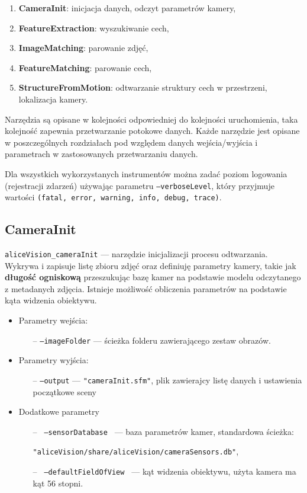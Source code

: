\begin{enumerate}
   \item \textbf{CameraInit}: inicjacja danych, odczyt parametrów kamery,
   \item \textbf{FeatureExtraction}: wyszukiwanie cech,
   \item \textbf{ImageMatching}: parowanie zdjęć,
   \item \textbf{FeatureMatching}: parowanie cech,
   \item \textbf{StructureFromMotion}: odtwarzanie struktury cech w przestrzeni, lokalizacja kamery.
\end{enumerate}

Narzędzia są opisane w kolejności odpowiedniej do kolejności uruchomienia, taka kolejność zapewnia przetwarzanie potokowe danych.
Każde narzędzie jest opisane w poszczególnych rozdziałach pod względem danych wejścia/wyjścia i parametrach w zastosowanych przetwarzaniu danych.

Dla wszystkich wykorzystanych instrumentów można zadać poziom logowania (rejestracji zdarzeń) używając parametru \texttt{--verboseLevel}, który przyjmuje wartości \texttt{(fatal, error, warning, info, debug, trace)}.

\subsection{CameraInit}

\texttt{aliceVision\_cameraInit} --- narzędzie inicjalizacji procesu odtwarzania.
Wykrywa i zapisuje listę zbioru zdjęć oraz definiuję parametry kamery, takie jak \textbf{długość ogniskową} przeszukując bazę kamer na podstawie modelu odczytanego z metadanych zdjęcia. Istnieje możliwość obliczenia parametrów na podstawie kąta widzenia obiektywu.

\begin{itemize}
   \item Parametry wejścia:
   \begin{itemize}
      \item[--] \texttt{--imageFolder} --- ścieżka folderu zawierającego zestaw obrazów.
   \end{itemize}

   \item Parametry wyjścia:
   \begin{itemize}
      \item[--] \texttt{--output} --- \texttt{"cameraInit.sfm"}, plik zawierajcy listę danych i ustawienia początkowe sceny
   \end{itemize}

   \item Dodatkowe parametry
   \begin{itemize}
      \item[--] \texttt{ --sensorDatabase } --- baza parametrów kamer, standardowa ścieżka:

      \texttt{"aliceVision/share/aliceVision/cameraSensors.db"},
      \item[--] \texttt{ --defaultFieldOfView } --- kąt widzenia obiektywu, użyta kamera ma kąt 56 stopni.
   \end{itemize}
\end{itemize}

